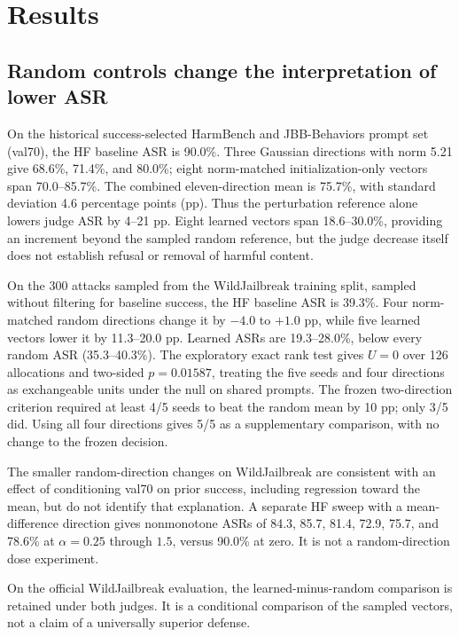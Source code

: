 \section{Results}
\label{sec:results}
\subsection{Random controls change the interpretation of lower ASR}

On the historical success-selected HarmBench and JBB-Behaviors prompt set (val70), the HF baseline ASR is 90.0\%. Three Gaussian directions with norm 5.21 give 68.6\%, 71.4\%, and 80.0\%; eight norm-matched initialization-only vectors span 70.0--85.7\%. The combined eleven-direction mean is 75.7\%, with standard deviation 4.6 percentage points (pp). Thus the perturbation reference alone lowers judge ASR by 4--21 pp. Eight learned vectors span 18.6--30.0\%, providing an increment beyond the sampled random reference, but the judge decrease itself does not establish refusal or removal of harmful content.


On the 300 attacks sampled from the WildJailbreak training split, sampled without filtering for baseline success, the HF baseline ASR is 39.3\%. Four norm-matched random directions change it by $-4.0$ to $+1.0$ pp, while five learned vectors lower it by 11.3--20.0 pp. Learned ASRs are 19.3--28.0\%, below every random ASR (35.3--40.3\%). The exploratory exact rank test gives $U=0$ over 126 allocations and two-sided $p=0.01587$, treating the five seeds and four directions as exchangeable units under the null on shared prompts. The frozen two-direction criterion required at least 4/5 seeds to beat the random mean by 10 pp; only 3/5 did. Using all four directions gives 5/5 as a supplementary comparison, with no change to the frozen decision.

The smaller random-direction changes on WildJailbreak are consistent with an effect of conditioning val70 on prior success, including regression toward the mean, but do not identify that explanation. A separate HF sweep with a mean-difference direction gives nonmonotone ASRs of 84.3, 85.7, 81.4, 72.9, 75.7, and 78.6\% at $\alpha=0.25$ through $1.5$, versus 90.0\% at zero. It is not a random-direction dose experiment.


On the official WildJailbreak evaluation, the learned-minus-random comparison is retained under both judges. It is a conditional comparison of the sampled vectors, not a claim of a universally superior defense.



